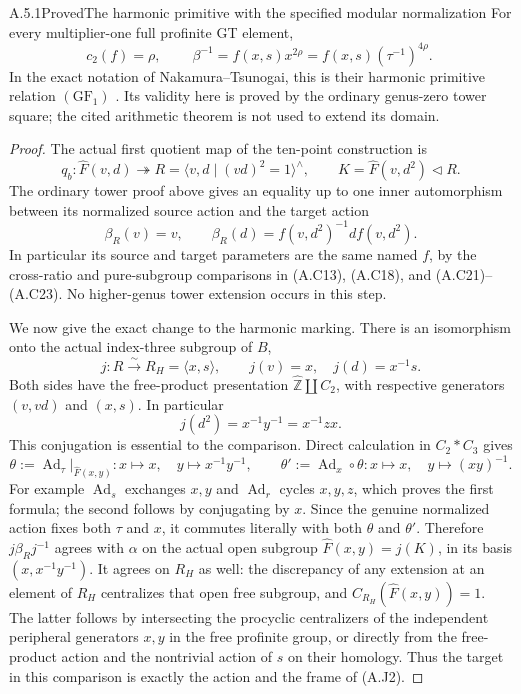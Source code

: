 \begin{result}{A.5.1}{Proved}{The harmonic primitive with the specified modular normalization}
For every multiplier-one full profinite GT element,
\[
 c_2(f)=\rho,\qquad
 \boxed{\ \beta^{-1}=f(x,s)x^{2\rho}
                      =f(x,s)(\tau^{-1})^{4\rho}.\ }
 \tag{A.J3}
\]
In the exact notation of Nakamura--Tsunogai, this is their
harmonic primitive relation $(\mathrm{GF}_1)$
\cite[Theorem 2, p.~199, and the comparison on p.~200]{CA_NT2002}.
Its validity here is proved by the ordinary genus-zero tower
square; the cited arithmetic theorem is not used to extend its
domain.
\end{result}
\begin{proof}
The actual first quotient map of the ten-point construction is
\[
 q_b:\widehat F(v,d)\twoheadrightarrow
 R=\langle v,d\mid(vd)^2=1\rangle^{\wedge},\qquad
 K=\widehat F(v,d^2)\triangleleft R.
 \tag{A.J4}
\]
The ordinary tower proof above gives an equality up to one
inner automorphism between its normalized source action and
the target action
\[
 \beta_R(v)=v,\qquad
 \beta_R(d)=f(v,d^2)^{-1}df(v,d^2).
 \tag{A.J5}
\]
In particular its source and target parameters are the same
named $f$, by the cross-ratio and pure-subgroup comparisons in
(A.C13), (A.C18), and (A.C21)--(A.C23).  No higher-genus tower
extension occurs in this step.

We now give the exact change to the harmonic marking.  There
is an isomorphism onto the actual index-three subgroup of $B$,
\[
 j:R\xrightarrow{\sim}R_H=\langle x,s\rangle,
 \qquad j(v)=x,\quad j(d)=x^{-1}s.
 \tag{A.J6}
\]
Both sides have the free-product presentation
$\widehat{\mathbb Z}\amalg C_2$, with respective generators
$(v,vd)$ and $(x,s)$.  In particular
\[
 j(d^2)=x^{-1}y^{-1}=x^{-1}zx.
 \tag{A.J7}
\]
This conjugation is essential to the comparison.  Direct
calculation in $C_2*C_3$ gives
\[
 \theta:=\operatorname{Ad}_{\tau}|_{\widehat F(x,y)}:
 x\mapsto x,\quad y\mapsto x^{-1}y^{-1},
 \qquad
 \theta':=\operatorname{Ad}_x\circ\theta:
 x\mapsto x,\quad y\mapsto (xy)^{-1}.
 \tag{A.J8}
\]
For example $\operatorname{Ad}_s$ exchanges $x,y$ and
$\operatorname{Ad}_r$ cycles $x,y,z$, which proves the first
formula; the second follows by conjugating by $x$.  Since the
genuine normalized action fixes both $\tau$ and $x$, it commutes
literally with both $\theta$ and $\theta'$.  Therefore
$j\beta_Rj^{-1}$ agrees with $\alpha$ on the actual open
subgroup $\widehat F(x,y)=j(K)$, in its basis
$(x,x^{-1}y^{-1})$.  It agrees on $R_H$ as well: the
discrepancy of any extension at an element of $R_H$ centralizes
that open free subgroup, and
$C_{R_H}(\widehat F(x,y))=1$.  The latter follows by intersecting
the procyclic centralizers of the independent peripheral
generators $x,y$ in the free profinite group, or directly from
the free-product action and the nontrivial action of $s$ on
their homology.  Thus the target in this comparison is exactly
the action and the frame of (A.J2).


\end{proof}
